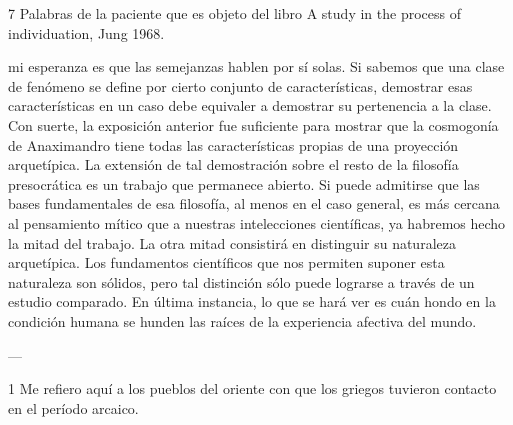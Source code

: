 \documentclass[a4paper]{article}
\begin{document}
7 Palabras de la paciente que es objeto del libro A study in the process of
individuation, Jung 1968.

mi esperanza es que las semejanzas hablen por sí solas. Si sabemos que una clase
de fenómeno se define por cierto conjunto de características, demostrar esas
características en un caso debe equivaler a demostrar su pertenencia a la clase.
Con suerte, la exposición anterior fue suficiente para mostrar que la cosmogonía
de Anaximandro tiene todas las características propias de una proyección
arquetípica. La extensión de tal demostración sobre el resto de la filosofía
presocrática es un trabajo que permanece abierto. Si puede admitirse que las
bases fundamentales de esa filosofía, al menos en el caso general, es más
cercana al pensamiento mítico que a nuestras intelecciones científicas, ya
habremos hecho la mitad del trabajo. La otra mitad consistirá en distinguir su
naturaleza arquetípica. Los fundamentos científicos que nos permiten suponer
esta naturaleza son sólidos, pero tal distinción sólo puede lograrse a través de
un estudio comparado. En última instancia, lo que se hará ver es cuán hondo en
la condición humana se hunden las raíces de la experiencia afectiva del mundo.

---

1 Me refiero aquí a los pueblos del oriente con que los griegos tuvieron
contacto en el período arcaico.


    
\end{document}
